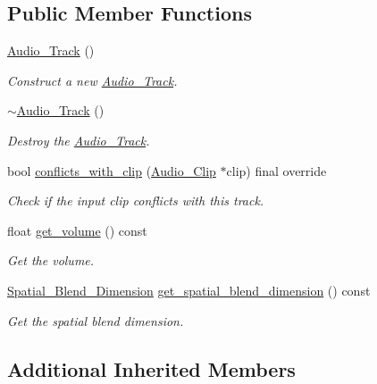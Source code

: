 \subsection*{Public Member Functions}
\begin{DoxyCompactItemize}
\item 
\mbox{\hyperlink{classprz_1_1_audio___track_ad37bc5741cd0823f8f9277d00a81f50f}{Audio\+\_\+\+Track}} ()
\begin{DoxyCompactList}\small\item\em Construct a new \mbox{\hyperlink{classprz_1_1_audio___track}{Audio\+\_\+\+Track}}. \end{DoxyCompactList}\item 
\mbox{\hyperlink{classprz_1_1_audio___track_a32d24bf61b957d9d5e483eb4c4fbf5c2}{$\sim$\+Audio\+\_\+\+Track}} ()
\begin{DoxyCompactList}\small\item\em Destroy the \mbox{\hyperlink{classprz_1_1_audio___track}{Audio\+\_\+\+Track}}. \end{DoxyCompactList}\item 
bool \mbox{\hyperlink{classprz_1_1_audio___track_a6487c33aca7d2d496ca39037f5f75170}{conflicts\+\_\+with\+\_\+clip}} (\mbox{\hyperlink{classprz_1_1_audio___clip}{Audio\+\_\+\+Clip}} $\ast$clip) final override
\begin{DoxyCompactList}\small\item\em Check if the input clip conflicts with this track. \end{DoxyCompactList}\item 
float \mbox{\hyperlink{classprz_1_1_audio___track_ad3a1f86e10f7e128a5589b621ff28b45}{get\+\_\+volume}} () const
\begin{DoxyCompactList}\small\item\em Get the volume. \end{DoxyCompactList}\item 
\mbox{\hyperlink{classprz_1_1_audio___track_a4fb1dc3dd45713ba4c3e56918721d12a}{Spatial\+\_\+\+Blend\+\_\+\+Dimension}} \mbox{\hyperlink{classprz_1_1_audio___track_ac10fc428fddc350fb7e6b4d29d287a3a}{get\+\_\+spatial\+\_\+blend\+\_\+dimension}} () const
\begin{DoxyCompactList}\small\item\em Get the spatial blend dimension. \end{DoxyCompactList}\end{DoxyCompactItemize}
\subsection*{Additional Inherited Members}


